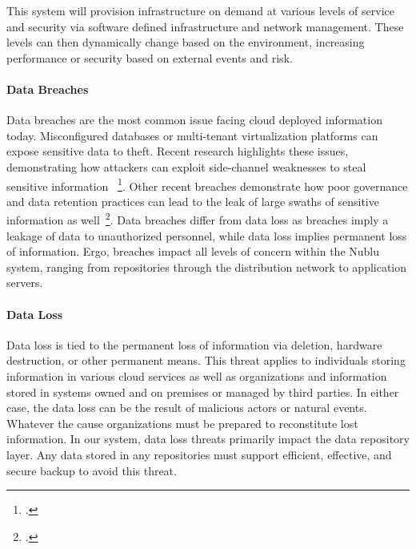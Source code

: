 \documentclass[10pt,letterpaper]{article}
\begin{document}
This system will provision infrastructure on demand at various levels of service and security via software defined infrastructure and network management. These levels can then dynamically change based on the environment, increasing performance or security based on external events and risk.

\paragraph{Data Breaches} Data breaches are the most common issue facing cloud deployed information today.  Misconfigured databases or multi-tenant virtualization platforms can expose sensitive data to theft.  Recent research highlights these issues, demonstrating how attackers can exploit side-channel weaknesses to steal sensitive information ~\footcite{ZhJuReRi:12}.  Other recent breaches demonstrate how poor governance and data retention practices can lead to the leak of large swaths of sensitive information as well~\footcite{De:12}.  Data breaches differ from data loss as breaches imply a leakage of data to unauthorized personnel, while data loss implies permanent loss of information.  Ergo, breaches impact all levels of concern within the Nublu system, ranging from repositories through the distribution network to application servers. 


\paragraph{Data Loss} Data loss is tied to the permanent loss of information via deletion, hardware destruction, or other permanent means. This threat applies to individuals storing information in various cloud services as well as organizations and information stored in systems owned and on premises or managed by third parties. In either case, the data loss can be the result of malicious actors or natural events.  Whatever the cause organizations must be prepared to reconstitute lost information. In our system, data loss threats primarily impact the data repository layer. Any data stored in any repositories must support efficient, effective, and secure backup to avoid this threat.
\end{document}

